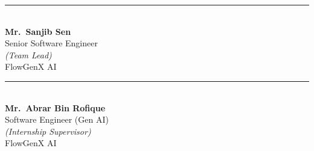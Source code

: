 \vspace{1.0cm}

\noindent
\begin{minipage}[t]{0.45\textwidth}
\centering
\rule{0pt}{1.6cm}\par
\rule{6cm}{0.4pt} \\[0.2cm]
\textbf{Mr.~Sanjib Sen} \\
Senior Software Engineer \\
\emph{(Team Lead)} \\
FlowGenX AI
\end{minipage}
\hfill
\begin{minipage}[t]{0.45\textwidth}
\centering
\rule{0pt}{1.6cm}\par
\rule{6cm}{0.4pt} \\[0.2cm]
\textbf{Mr.~Abrar Bin Rofique} \\
Software Engineer (Gen AI) \\
\emph{(Internship Supervisor)} \\
FlowGenX AI
\end{minipage}

\newpage
